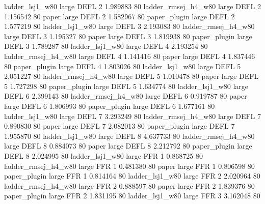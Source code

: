     ladder_lsj1_w80      large     DEFL                 2  1.989883 80
ladder_rmsej_h4_w80      large     DEFL                 2  1.156542 80
              paper      large     DEFL                 2  1.582967 80
       paper_plugin      large     DEFL                 2  1.577219 80
    ladder_lsj1_w80      large     DEFL                 3  2.193083 80
ladder_rmsej_h4_w80      large     DEFL                 3  1.195327 80
              paper      large     DEFL                 3  1.819938 80
       paper_plugin      large     DEFL                 3  1.789287 80
    ladder_lsj1_w80      large     DEFL                 4  2.193254 80
ladder_rmsej_h4_w80      large     DEFL                 4  1.141416 80
              paper      large     DEFL                 4  1.837446 80
       paper_plugin      large     DEFL                 4  1.803026 80
    ladder_lsj1_w80      large     DEFL                 5  2.051227 80
ladder_rmsej_h4_w80      large     DEFL                 5  1.010478 80
              paper      large     DEFL                 5  1.727298 80
       paper_plugin      large     DEFL                 5  1.634774 80
    ladder_lsj1_w80      large     DEFL                 6  2.399143 80
ladder_rmsej_h4_w80      large     DEFL                 6  0.919787 80
              paper      large     DEFL                 6  1.806993 80
       paper_plugin      large     DEFL                 6  1.677161 80
    ladder_lsj1_w80      large     DEFL                 7  3.293249 80
ladder_rmsej_h4_w80      large     DEFL                 7  0.890830 80
              paper      large     DEFL                 7  2.082013 80
       paper_plugin      large     DEFL                 7  1.955870 80
    ladder_lsj1_w80      large     DEFL                 8  4.637733 80
ladder_rmsej_h4_w80      large     DEFL                 8  0.884073 80
              paper      large     DEFL                 8  2.212792 80
       paper_plugin      large     DEFL                 8  2.024995 80
    ladder_lsj1_w80      large      FFR                 1  0.868725 80
ladder_rmsej_h4_w80      large      FFR                 1  0.481380 80
              paper      large      FFR                 1  0.806598 80
       paper_plugin      large      FFR                 1  0.814164 80
    ladder_lsj1_w80      large      FFR                 2  2.020964 80
ladder_rmsej_h4_w80      large      FFR                 2  0.888597 80
              paper      large      FFR                 2  1.839376 80
       paper_plugin      large      FFR                 2  1.831195 80
    ladder_lsj1_w80      large      FFR                 3  3.162048 80

